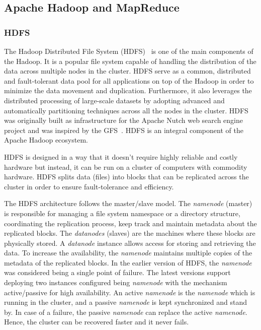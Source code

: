 \subsection{Apache Hadoop and MapReduce}

\subsubsection{HDFS}
\label{sec:hdfs}
The Hadoop Distributed File System (\gls{HDFS})~\cite{Shvachko:2010:HDF:1913798.1914427} is one of the main components of the Hadoop. 
It is a popular file system capable of handling the distribution of the data across multiple nodes in the cluster.
\gls{HDFS} serve as a common, distributed and fault-tolerant data pool for all applications on top of the Hadoop in order to minimize the data movement and duplication.
Furthermore, it also leverages the distributed processing of large-scale datasets by adopting advanced and automatically partitioning techniques across all the nodes in the cluster.
\gls{HDFS} was originally built as infrastructure for the Apache Nutch web search engine project and was inspired by the \gls{GFS}~\cite{Ghemawat:2003:GFS:945445.945450}. 
\gls{HDFS} is an integral component of the Apache Hadoop ecosystem.

\gls{HDFS} is designed in a way that it doesn't require highly reliable and costly hardware but instead, it can be run on a cluster of computers with commodity hardware.
\gls{HDFS} splits data (files) into blocks that can be replicated across the cluster in order to ensure fault-tolerance and efficiency.

The \gls{HDFS} architecture follows the master/slave model. 
The \textit{namenode} (master) is responsible for managing a file system namespace or a directory structure, coordinating the replication process, keep track and maintain metadata about the replicated blocks.
The \textit{datanodes} (slaves) are the machines where these blocks are physically stored.
A \textit{datanode} instance allows access for storing and retrieving the data. 
To increase the availability, the \textit{namenode} maintains multiple copies of the metadata of the replicated blocks.
In the earlier version of \gls{HDFS}, the \textit{namenode} was considered being a single point of failure.
The latest versions support deploying two instances configured being \textit{namenode} with the mechanism active/passive for high availability.
An active \textit{namenode} is the \textit{namenode} which is running in the cluster, and a passive \textit{namenode} is kept synchronized and stand by.
In case of a failure, the passive \textit{namenode} can replace the active \textit{namenode}.
Hence, the cluster can be recovered faster and it never fails.

